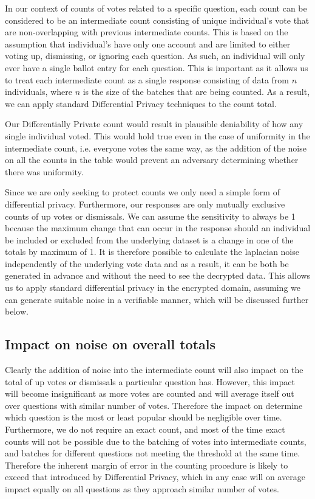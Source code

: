 \documentclass[10pt,a4paper]{article}
\begin{document}
In our context of counts of votes related to a specific question, each count can be considered to be an intermediate count consisting of unique individual's vote that are non-overlapping with previous intermediate counts. This is based on the assumption that individual's have only one account and are limited to either voting up, dismissing, or ignoring each question. As such, an individual will only ever have a single ballot entry for each question. This is important as it allows us to treat each intermediate count as a single response consisting of data from $n$ individuals, where $n$ is the size of the batches that are being counted. As a result, we can apply standard Differential Privacy techniques to the count total. 

Our Differentially Private count would result in plausible deniability of how any single individual voted. This would hold true even in the case of uniformity in the intermediate count, i.e. everyone votes the same way, as the addition of the noise on all the counts in the table would prevent an adversary determining whether there was uniformity. 

Since we are only seeking to protect counts we only need a simple form of differential privacy. Furthermore, our responses are only mutually exclusive counts of up votes or dismissals. We can assume the sensitivity to always be 1 because the maximum change that can occur in the response should an individual be included or excluded from the underlying dataset is a change in one of the totals by maximum of 1. It is therefore possible to calculate the laplacian noise independently of the underlying vote data and as a result, it can be both be generated in advance and without the need to see the decrypted data. This allows us to apply standard differential privacy in the encrypted domain, assuming we can generate suitable noise in a verifiable manner, which will be discussed further below. 

\subsection{Impact on noise on overall totals}
Clearly the addition of noise into the intermediate count will also impact on the total of up votes or dismissals a particular question has. However, this impact will become insignificant as more votes are counted and will average itself out over questions with similar number of votes. Therefore the impact on determine which question is the most or least popular should be negligible over time. Furthermore, we do not require an exact count, and most of the time exact counts will not be possible due to the batching of votes into intermediate counts, and batches for different questions not meeting the threshold at the same time. Therefore the inherent margin of error in the counting procedure is likely to exceed that introduced by Differential Privacy, which in any case will on average impact equally on all questions as they approach similar number of votes. 
\end{document}
